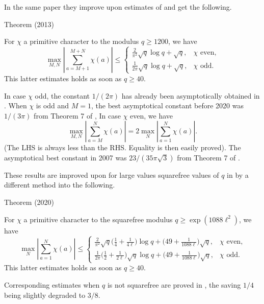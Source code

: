In the same paper they improve upon estimates of
\cite{Pomerance*11} and get the following.
\par 
\begin{thm}{Theorem (2013)}

  For $\chi$ a primitive character to the modulus $q \ge 1200$, we have
$$
\max_{M,N}\left|\sum_{a=M+1}^{M+N}\chi(a)\right|
\le
\begin{cases}
\frac{2}{\pi^2}\sqrt{q}\log q+\sqrt{q},&
  \text{$\chi$ even,}\\
\frac{1}{2\pi}\sqrt{q}\log q+\sqrt{q},&
  \text{$\chi$ odd}.
\end{cases}
$$
This latter estimates holds as soon as $q\ge40$.
\end{thm}


In case $\chi$ odd, the constant $1/(2\pi)$ has already
been asymptotically obtained in
\cite{Landau*18-3}.
When $\chi$ is odd and $M=1$, the best asymptotical constant before 2020 was
$1/(3\pi)$ from Theorem 7 of
\cite{Granville-Soundararajan*07},
In case $\chi$ even, we have
$$
\max_{M,N}\left|\sum_{a=M}^N\chi(a)\right|
=2\max_{N}\left|\sum_{a=1}^N\chi(a)\right|.
$$
(The LHS is always less than the RHS. Equality is then easily proved).
The asymptotical best constant in 2007
was $23/(35\pi\sqrt{3})$ from Theorem 7 of
\cite{Granville-Soundararajan*07}.

These results are improved upon for large values squarefree values of $q$ in
\cite{Bordignon-Kerr*20}
by a different method into the following.
\par 
\begin{thm}{Theorem (2020)}

  For $\chi$ a primitive character to the squarefree modulus $q \ge \exp(1088\ell^2)$, we have
$$
\max_{N}\left|\sum_{a=1}^{N}\chi(a)\right|
\le
\begin{cases}
  \frac{2}{\pi^2}\sqrt{q}\bigl(\frac14+\frac{1}{4\ell}\bigr)\log q
  +\bigl(49+\frac{1}{1088\ell}\bigr)\sqrt{q},&
  \text{$\chi$ even,}\\
  \frac{1}{2\pi}\bigl(\frac12+\frac{1}{2\ell}\bigr)\sqrt{q}\log q
  +\bigl(49+\frac{1}{1088\ell}\bigr)\sqrt{q},&
  \text{$\chi$ odd}.
\end{cases}
$$
This latter estimates holds as soon as $q\ge40$.
\end{thm}


Corresponding estimates when $q$ is not squarefree are proved in
\cite{Bordignon*21}, the
saving $1/4$ being slightly degraded to $3/8$.



